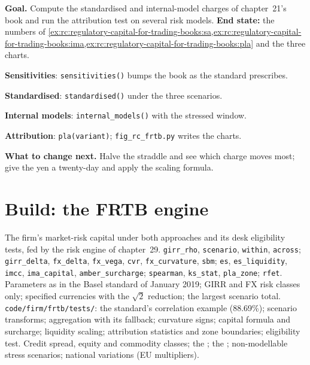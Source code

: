 \begin{tutorial}
\textbf{Goal.} Compute the standardised and internal-model charges of chapter~21's book and run
the attribution test on several risk models. \textbf{End state:} the numbers of
\cref{ex:rc:regulatory-capital-for-trading-books:sa,ex:rc:regulatory-capital-for-trading-books:ima,ex:rc:regulatory-capital-for-trading-books:pla}
and the three charts.
\begin{tutsteps}
\item \textbf{Sensitivities}: \texttt{sensitivities()} bumps the book as the standard prescribes.
\item \textbf{Standardised}: \texttt{standardised()} under the three scenarios.
\item \textbf{Internal models}: \texttt{internal\_models()} with the stressed window.
\item \textbf{Attribution}: \texttt{pla(variant)}; \texttt{fig\_rc\_frtb.py} writes the charts.
\end{tutsteps}
\textbf{What to change next.} Halve the straddle and see which charge moves most; give the
yen a twenty-day  and apply the scaling formula.
\end{tutorial}

\section{Build: the FRTB engine}\label{bld:rc:regulatory-capital-for-trading-books:frtb}

\begin{build}
 The firm's market-risk capital under both approaches and its desk eligibility
tests, fed by the risk engine of chapter~29.
 \texttt{girr\_rho}, \texttt{scenario}, \texttt{within}, \texttt{across};
\texttt{girr\_delta}, \texttt{fx\_delta}, \texttt{fx\_vega}, \texttt{cvr}, \texttt{fx\_curvature},
\texttt{sbm}; \texttt{es}, \texttt{es\_liquidity}, \texttt{imcc}, \texttt{ima\_capital},
\texttt{amber\_surcharge}; \texttt{spearman}, \texttt{ks\_stat}, \texttt{pla\_zone};
\texttt{rfet}.
 Parameters as in the Basel standard of January 2019; GIRR and FX risk classes
only; specified currencies with the $\sqrt2$ reduction; the largest scenario total.
 \texttt{code/firm/frtb/tests/}: the standard's correlation example
(88.69\%); scenario transforms; aggregation with its fallback; curvature signs; capital formula
and surcharge; liquidity scaling; attribution statistics and zone boundaries; eligibility test.
 Credit spread, equity and commodity classes; the ; the
; non-modellable stress scenarios; national variations (EU multipliers).
\end{build}

